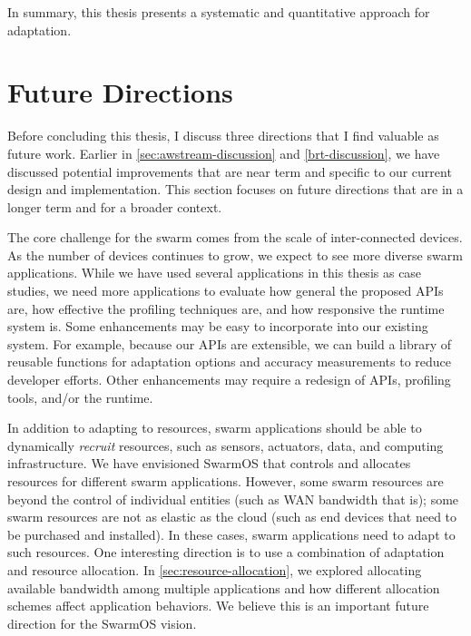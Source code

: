 \documentclass[thesis.tex]{subfiles}
\begin{document}
In summary, this thesis presents a systematic and quantitative approach for
adaptation.

\section{Future Directions}
\label{sec:future-directions}

Before concluding this thesis, I discuss three directions that I find valuable
as future work. Earlier in \autoref{sec:awstream-discussion} and
\autoref{brt-discussion}, we have discussed potential improvements that are near
term and specific to our current design and implementation. This section focuses
on future directions that are in a longer term and for a broader context.

 The core challenge for the
swarm comes from the scale of inter-connected devices. As the number of devices
continues to grow, we expect to see more diverse swarm applications. While we
have used several applications in this thesis as case studies, we need more
applications to evaluate how general the proposed APIs are, how effective the
profiling techniques are, and how responsive the runtime system is. Some
enhancements may be easy to incorporate into our existing system. For example,
because our APIs are extensible, we can build a library of reusable functions
for adaptation options and accuracy measurements to reduce developer
efforts. Other enhancements may require a redesign of APIs, profiling tools,
and/or the runtime.

 In addition to adapting to resources,
swarm applications should be able to dynamically \emph{recruit} resources, such
as sensors, actuators, data, and computing infrastructure. We have envisioned
SwarmOS that controls and allocates resources for different swarm
applications. However, some swarm resources are beyond the control of individual
entities (such as WAN bandwidth that is); some swarm resources are not as
elastic as the cloud (such as end devices that need to be purchased and
installed). In these cases, swarm applications need to adapt to such
resources. One interesting direction is to use a combination of adaptation and
resource allocation. In \autoref{sec:resource-allocation}, we explored
allocating available bandwidth among multiple applications and how different
allocation schemes affect application behaviors. We believe this is an important
future direction for the SwarmOS vision.
\end{document}
